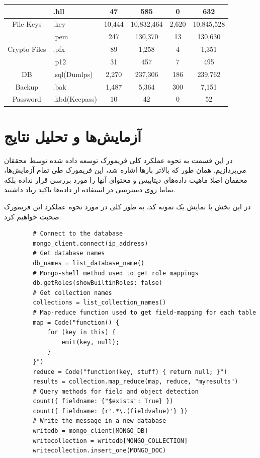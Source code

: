 \documentclass[10pt, a4paper]{article}
\begin{document}
\begin{LTR}
\begin{table}[!h]
{\begin{tabular}{|c|l|ccc|c|}
                & .hll & 47 & 585 & 0 & 632 \\ \hline
                File Keys & .key & 10,444 & 10,832,464 & 2,620 & 10,845,528 \\ \hline
                \multirow{3}{*}{Crypto Files}
                & .pem & 247 & 130,370 & 13 & 130,630 \\
                & .pfx & 89 & 1,258 & 4 & 1,351  \\
                & .p12 & 31 & 457 & 7 & 495 \\ \hline
                DB & .sql(Dumlps) & 2,270 & 237,306 & 186 & 239,762 \\ \hline
                Backup & .bak & 1,487 & 5,364 & 300 & 7,151 \\ \hline
                Password & .kbd(Keepass) & 10 & 42 & 0 & 52 \\ \hline
            \end{tabular}
        }
    \end{table}
\end{LTR}

\newpage

\section{آزمایش‌ها و تحلیل نتایج}

در‌ این قسمت به نحوه عملکرد کلی فریمورک توسعه داده شده توسط محققان می‌پردازیم.
همان طور که بالاتر بارها اشاره شد، این فریمورک طی تمام آزمایش‌ها، محققان اصلا
ماهیت داده‌های دیتابیس و محتوای آنها را مورد بررسی قرار نداده بلکه تماما روی
دسترسی در استفاده از داده‌ها تاکید زیاد داشتند.

در این بخش با نمایش یک نمونه کد، به طور کلی در مورد نحوه عملکرد این فریمورک صحبت
خواهیم کرد.

\begin{LTR}
    \begin{lstlisting}
        # Connect to the database
        mongo_client.connect(ip_address)
        # Get database names
        db_names = list_database_name()
        # Mongo-shell method used to get role mappings
        db.getRoles(showBuiltinRoles: false)
        # Get collection names
        collections = list_collection_names()
        # Map-reduce function used to get field-mapping for each table
        map = Code("function() {
            for (key in this) {
                emit(key, null);
            }
        }")
        reduce = Code("function(key, stuff) { return null; }")
        results = collection.map_reduce(map, reduce, "myresults")
        # Query methods for field and object detection
        count({ fieldname: {"$exists": True} })
        count({ fieldname: {r'.*\.(fieldvalue)'} })
        # Write the message in a new database
        writedb = mongo_client[MONGO_DB]
        writecollection = writedb[MONGO_COLLECTION]
        writecollection.insert_one(MONGO_DOC)
    \end{lstlisting}
\end{LTR}
\end{document}
